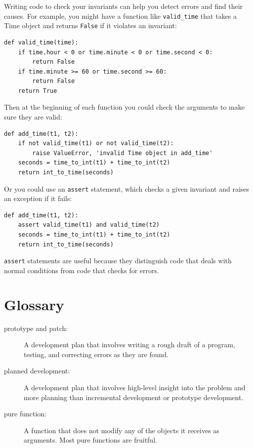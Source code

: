 \documentclass[10pt]{book}
\begin{document}
\begin{CJK}{UTF8}{gbsn}
Writing code to check your invariants can help you detect errors
and find their causes.  For example, you might have a function
like \verb"valid_time" that takes a Time object and returns
{\tt False} if it violates an invariant:

\begin{verbatim}
def valid_time(time):
    if time.hour < 0 or time.minute < 0 or time.second < 0:
        return False
    if time.minute >= 60 or time.second >= 60:
        return False
    return True
\end{verbatim}
%
Then at the beginning of each function you could check the
arguments to make sure they are valid:

\begin{verbatim}
def add_time(t1, t2):
    if not valid_time(t1) or not valid_time(t2):
        raise ValueError, 'invalid Time object in add_time'
    seconds = time_to_int(t1) + time_to_int(t2)
    return int_to_time(seconds)
\end{verbatim}
%
Or you could use an {\tt assert} statement, which checks a given invariant
and raises an exception if it fails:

\begin{verbatim}
def add_time(t1, t2):
    assert valid_time(t1) and valid_time(t2)
    seconds = time_to_int(t1) + time_to_int(t2)
    return int_to_time(seconds)
\end{verbatim}
%
{\tt assert} statements are useful because they distinguish
code that deals with normal conditions from code
that checks for errors.


\section{Glossary}

\begin{description}

\item[prototype and patch:] A development plan that involves
writing a rough draft of a program, testing, and correcting errors as
they are found.

\item[planned development:] A development plan that involves
high-level insight into the problem and more planning than incremental
development or prototype development.

\item[pure function:] A function that does not modify any of the objects it
receives as arguments.  Most pure functions are fruitful.


\end{description}
\end{CJK}
\end{document}
